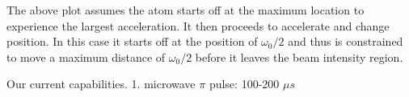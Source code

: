 \documentclass[11pt]{article}
\begin{document}
    The above plot assumes the atom starts off at the maximum location to
experience the largest acceleration. It then proceeds to accelerate and
change position. In this case it starts off at the position of
\(\omega_0/2\) and thus is constrained to move a maximum distance of
\(\omega_0/2\) before it leaves the beam intensity region.

    Our current capabilities. 1. microwave \(\pi\) pulse: 100-200 \(\mu s\)


    
    
    
    
\end{document}
